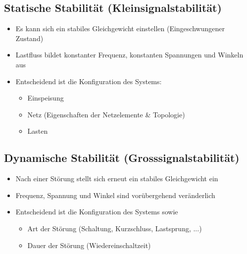 \subsection{Statische Stabilität (Kleinsignalstabilität)}
\begin{itemize}
    \item Es kann sich ein stabiles Gleichgewicht einstellen (Eingeschwungener Zustand)
    \item Lastfluss bildet konstanter Frequenz, konstanten Spannungen und Winkeln aus
    \item Entscheidend ist die Konfiguration des Systems:
    \begin{itemize}
        \item Einspeisung
        \item Netz (Eigenschaften der Netzelemente \& Topologie)
        \item Lasten
    \end{itemize}
\end{itemize}

\subsection{Dynamische Stabilität (Grosssignalstabilität)}

\begin{itemize}
    \item Nach einer Störung stellt sich erneut ein stabiles Gleichgewicht ein
    \item Frequenz, Spannung und Winkel sind vorübergehend veränderlich
    \item Entscheidend ist die Konfiguration des Systems sowie
    \begin{itemize}
        \item Art der Störung (Schaltung, Kurzschluss, Lastsprung, ...)
        \item Dauer der Störung (Wiedereinschaltzeit)
    \end{itemize}
\end{itemize}